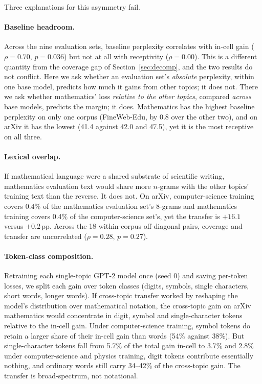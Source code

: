 \documentclass[11pt]{article}
\begin{document}
Three explanations for this asymmetry fail.

\paragraph{Baseline headroom.} Across the nine evaluation sets, baseline
perplexity correlates with in-cell gain ($\rho{=}0.70$, $p{=}0.036$) but not
at all with receptivity ($\rho{=}0.00$). This is a different quantity from
the coverage gap of Section~\ref{sec:decomp}, and the two results do not
conflict. Here we ask whether an evaluation set's \emph{absolute}
perplexity, within one base model, predicts how much it gains from other
topics; it does not. There we ask whether mathematics' loss
\emph{relative to the other topics}, compared \emph{across} base models,
predicts the margin; it does. Mathematics has the highest baseline perplexity on only one corpus
(FineWeb-Edu, by 0.8 over the other two), and on arXiv it has the lowest
(41.4 against 42.0 and 47.5), yet it is the most receptive on all three.

\paragraph{Lexical overlap.} If mathematical language were a shared
substrate of scientific writing, mathematics evaluation text would share
more $n$-grams with the other topics' training text than the reverse. It
does not. On arXiv, computer-science training covers 0.4\% of the
mathematics evaluation set's 8-grams and mathematics training covers 0.4\%
of the computer-science set's, yet the transfer is $+16.1$ versus $+0.2$\,pp.
Across the 18 within-corpus off-diagonal pairs, coverage and transfer are
uncorrelated ($\rho{=}0.28$, $p{=}0.27$).

\paragraph{Token-class composition.} Retraining each single-topic GPT-2
model once (seed 0) and saving per-token losses, we split each gain over
token classes (digits, symbols,
single characters, short words, longer words). If cross-topic transfer
worked by reshaping the model's distribution over mathematical notation, the
cross-topic gain on arXiv mathematics would concentrate in digit, symbol and
single-character tokens relative to the in-cell gain. Under computer-science
training, symbol tokens do retain a larger share of their in-cell gain than
words (54\% against 38\%). But single-character tokens fall from 5.7\% of
the total gain in-cell to 3.7\% and 2.8\% under computer-science and physics
training, digit tokens contribute essentially nothing, and ordinary words
still carry 34--42\% of the cross-topic gain. The transfer is broad-spectrum, not
notational.
\end{document}
